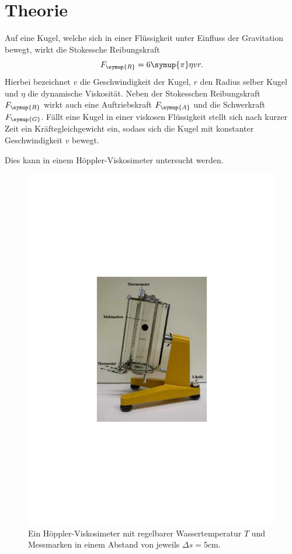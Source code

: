 \section{Theorie}
\label{sec:Theorie}
Auf eine Kugel, welche sich in einer Flüssigkeit unter Einfluss der Gravitation bewegt, wirkt die Stokessche Reibungskraft
\begin{equation}
    F_{\symup{R}}=6\symup{\pi}\eta v r.
\end{equation}
Hierbei bezeichnet $v$ die Geschwindigkeit der Kugel, $r$ den Radius selber Kugel und $\eta$ die dynamische Viskosität.
Neben der Stokesschen Reibungskraft $F_{\symup{R}}$ wirkt auch eine Auftriebskraft $F_{\symup{A}}$ und die Schwerkraft $F_{\symup{G}}$.
Fällt eine Kugel in einer viskosen Flüssigkeit stellt sich nach kurzer Zeit ein Kräftegleichgewicht ein, sodass sich die Kugel 
mit konstanter Geschwindigkeit $v$ bewegt.

Dies kann in einem Höppler-Viskosimeter untersucht werden.
\begin{figure}
    \centering
    \includegraphics{content/Hoeppler-Viskosimeter.pdf}
    \caption{Ein Höppler-Viskosimeter mit regelbarer Wassertemperatur $T$ und Messmarken in einem Abstand %
     von jeweils $\Delta s = 5\unit{\centi\metre}$. \cite{v107}}
     \label{fig:Hoeppler-Viskosimeter}
\end{figure}


